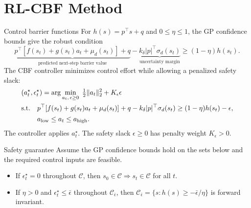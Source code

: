 \documentclass[aspectratio=169,10pt]{beamer}
\newcommand{\Cset}{\mathcal C}
\begin{document}
\section{RL-CBF Method}
\begin{frame}{Control barrier functions}
\small
\setlength{\abovedisplayskip}{5pt}
\setlength{\belowdisplayskip}{5pt}
For $h(s)=p^\top s+q$ and $0\le\eta\le1$, the GP confidence bounds give the robust condition
\begin{equation}
\underbrace{p^\top[f(s_t)+g(s_t)a_t+\mu_d(s_t)]+q}_{\text{predicted next-step barrier value}}
-\underbrace{k_\delta|p|^\top\sigma_d(s_t)}_{\text{uncertainty margin}}
\ge(1-\eta)h(s_t).
\end{equation}
The CBF controller minimizes control effort while allowing a penalized safety slack:
\begin{equation}
\begin{aligned}
&(a_t^\star,\epsilon_t^\star)=\arg\min_{a_t,\,\epsilon\ge0}\;\tfrac12\|a_t\|_2^2+K_\epsilon\epsilon\\[.1em]
&\text{s.t.}\quad p^\top\!\left[f(s_t)+g(s_t)a_t+\mu_d(s_t)\right]+q-k_\delta|p|^\top\sigma_d(s_t)\ge(1-\eta)h(s_t)-\epsilon,\\[.1em]
&\phantom{\text{s.t.}\quad}a_{\rm low}\le a_t\le a_{\rm high}.
\end{aligned}
\end{equation}
The controller applies $a_t^\star$. The safety slack $\epsilon\ge0$ has penalty weight $K_\epsilon>0$.
\begin{block}{Safety guarantee}
\small
Assume the GP confidence bounds hold on the sets below and the required control inputs are feasible.
\begin{itemize}\setlength\itemsep{.1em}
\item If $\epsilon_t^\star=0$ throughout $\Cset$, then $s_0\in\Cset\Rightarrow s_t\in\Cset$ for all $t$.
\item If $\eta>0$ and $\epsilon_t^\star\le\bar\epsilon$ throughout $\Cset_{\bar\epsilon}$, then
$\Cset_{\bar\epsilon}=\{s:h(s)\ge-\bar\epsilon/\eta\}$ is forward invariant.
\end{itemize}
\end{block}
\end{frame}
\end{document}
